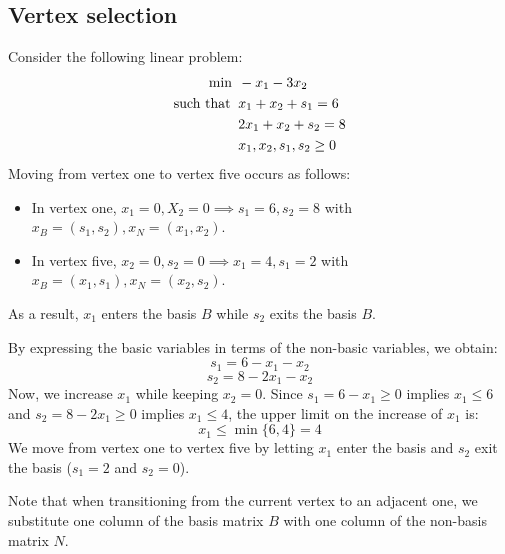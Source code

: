 \newpage
\subsection{Vertex selection}
\begin{example}
    Consider the following linear problem:
    \begin{align*}
        \min                      \:&\: -x_1-3x_2          \\
        \textnormal{such that }     &\: x_1+x_2+s_1 = 6  \\
                                    &\: 2x_1+x_2+s_2 = 8  \\
                                    &\: x_1,x_2,s_1,s_2 \geq 0
    \end{align*}
    Moving from vertex one to vertex five occurs as follows:
    \begin{itemize}
        \item In vertex one, $x_1 = 0, X_2=0 \implies s_1 = 6, s_2 = 8$ with $x_B = (s_1, s_2), x_N = (x_1, x_2)$.
        \item In vertex five, $x_2=0,s_2=0 \implies x_1=4,s_1=2$ with $x_B = (x_1, s_1), x_N = (x_2, s_2)$.
    \end{itemize}
    As a result, $x_1$ enters the basis $B$ while $s_2$ exits the basis $B$.

    By expressing the basic variables in terms of the non-basic variables, we obtain:
    \[s_1=6-x_1-x_2\]
    \[s_2=8-2x_1-x_2\]
    Now, we increase $x_1$ while keeping $x_2 = 0$.
    Since $s_1=6-x_1 \geq 0$ implies $x_1 \leq 6$ and $s_2=8-2x_1 \geq 0$ implies $x_1 \leq 4$, the upper limit on the increase of $x_1$ is: 
    \[x_1 \leq \min\{6,4\}=4\]
    We move from vertex one to vertex five by letting $x_1$ enter the basis and $s_2$ exit the basis ($s_1=2$ and $s_2=0$). 
\end{example}
Note that when transitioning from the current vertex to an adjacent one, we substitute one column of the basis matrix $B$ with one column of the non-basis matrix $N$.

